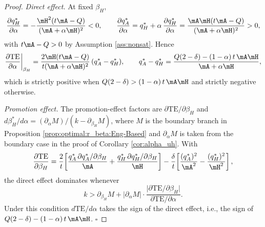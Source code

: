 \begin{proof}
\emph{Direct effect.} At fixed $\beta_H$,
\[
\frac{\partial q_H^*}{\partial\alpha}
= -\frac{\mH^2 (t\mA-Q)}{(\mA+\alpha\mH)^2} < 0,
\qquad
\frac{\partial q_A^*}{\partial\alpha}
= q_H^* + \alpha\,\frac{\partial q_H^*}{\partial\alpha}
= \frac{\mA\mH (t\mA-Q)}{(\mA+\alpha\mH)^2} > 0,
\]
with $t\mA - Q > 0$ by Assumption \ref{ass:nonsat}. Hence
\[
\frac{\partial\text{TE}}{\partial\alpha}\bigg|_{\beta_H}
= \frac{2\mH (t\mA-Q)}{t(\mA+\alpha\mH)^2}\,(q_A^* - q_H^*),
\qquad
q_A^* - q_H^* = \frac{Q(2-\delta) - (1-\alpha)\,t\,\mA\mH}{\mA+\alpha\mH},
\]
which is strictly positive when $Q(2-\delta) > (1-\alpha)\,t\,\mA\mH$
and strictly negative otherwise.

\emph{Promotion effect.} The promotion-effect factors are
$\partial\text{TE}/\partial\beta_H$ and
$d\beta_H^*/d\alpha = (\partial_\alpha M)/(k - \partial_{\beta_H}M)$,
where $M$ is the boundary branch in Proposition
\ref{prop:optimal:r_beta:Eng-Based} and $\partial_\alpha M$ is taken
from the boundary case in the proof of Corollary \ref{cor:alpha_uh}.
With
\[
\frac{\partial\text{TE}}{\partial\beta_H}
= \frac{2}{t}\!\left[\frac{q_A^*\,\partial q_A^*/\partial\beta_H}{\mA}
+ \frac{q_H^*\,\partial q_H^*/\partial\beta_H}{\mH}\right]
- \frac{\delta}{t}\!\left[\frac{(q_A^*)^2}{\mA^2} - \frac{(q_H^*)^2}{\mH^2}\right],
\]
the direct effect dominates whenever
\begin{equation}\label{eq:kbar-alpha-TE-E-bnd}
k > \partial_{\beta_H}M
+ \bigl|\partial_\alpha M\bigr|\cdot
\frac{\bigl|\partial\text{TE}/\partial\beta_H\bigr|}{\partial\text{TE}/\partial\alpha}.
\end{equation}
Under this condition $d\text{TE}/d\alpha$ takes the sign of the direct
effect, i.e., the sign of $Q(2-\delta) - (1-\alpha)\,t\,\mA\mH$.
\hfill$\square$
\end{proof}


